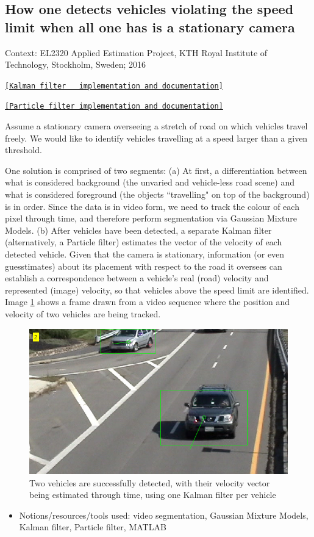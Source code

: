 \subsection{How one detects vehicles violating the speed limit when
all one has is a stationary camera}

Context: EL2320 Applied Estimation Project, KTH Royal Institute of Technology,
Stockholm, Sweden; 2016

\noindent \href{https://github.com/li9i/HT15_P2_EL2320_Lab_1}{\texttt{[Kalman filter \ \ implementation and documentation]}}

 \noindent \href{https://github.com/li9i/HT15_P2_EL2320_Lab_2}{\texttt{[Particle filter implementation and documentation]}}\\


\begin{problem}
Assume a stationary camera overseeing a stretch of road on
which vehicles travel freely. We would like to identify vehicles travelling at
a speed larger than a given threshold.
\end{problem}

One solution is comprised of two segments: (a) At first, a differentiation
between what is considered background (the unvaried and vehicle-less road scene)
and what is considered foreground (the objects ``travelling" on top of the
background) is in order. Since the data is in video form, we need to track
the colour of each pixel through time, and therefore perform segmentation via
Gaussian Mixture Models. (b) After vehicles have been detected, a separate
Kalman filter (alternatively, a Particle filter) estimates the vector of the
velocity of each detected vehicle. Given that the camera is stationary,
information (or even guesstimates) about its placement with respect to the
road it oversees can establish a correspondence between a vehicle's real (road)
velocity and represented (image) velocity, so that vehicles above the speed
limit are identified. Image \ref{fig:kf_1} shows a frame drawn from a video
sequence where the position and velocity of two vehicles are being tracked.

\begin{figure}[H]\centering
  \includegraphics[scale=0.55]{images/kf_1.png}
  \caption{\small Two vehicles are successfully detected, with their velocity
           vector being estimated through time, using one Kalman filter per
           vehicle}
  \label{fig:kf_1}
\end{figure}

\begin{itemize}
\item Notions/resources/tools used: video segmentation, Gaussian Mixture Models, Kalman filter,
Particle filter, MATLAB
\end{itemize}
